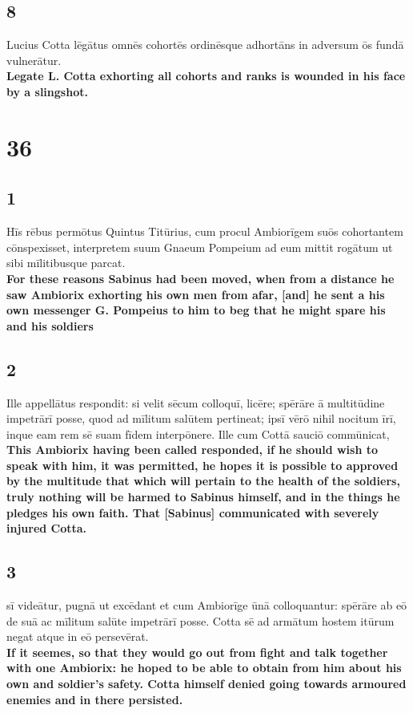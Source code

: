 \documentclass{article}
\begin{document}
\subsection*{8}
Lucius Cotta lēgātus omnēs cohortēs ordinēsque adhortāns in adversum ōs fundā vulnerātur.\\
\textbf{Legate L. Cotta exhorting all cohorts and ranks is wounded in his face by a slingshot.}

\section*{36}
\subsection*{1}
Hīs rēbus permōtus Quintus Titūrius, cum procul Ambiorīgem suōs cohortantem cōnspexisset, interpretem suum Gnaeum Pompeium ad eum mittit rogātum ut sibi mīlitibusque parcat.  \\ 
\textbf{For these reasons Sabinus had been moved, when from a distance he saw Ambiorix exhorting his own men from afar, [and] he sent a his own messenger G. Pompeius to him to beg that he might spare his and his soldiers}

\subsection*{2}
Ille appellātus respondit: si velit sēcum colloquī, licēre; spērāre ā multitūdine impetrārī posse, quod ad mīlitum salūtem pertineat; ipsī vērō nihil nocitum īrī, inque eam rem sē suam fīdem interpōnere. Ille cum Cottā sauciō commūnicat,  \\ 
\textbf{This Ambiorix having been called responded, if he should wish to speak with him, it was permitted, he hopes it is possible to approved by the multitude that which will pertain to the health of the soldiers, truly nothing will be harmed to Sabinus himself, and in the things he pledges his own faith. That [Sabinus] communicated with severely injured Cotta.}

\subsection*{3}
sī videātur, pugnā ut excēdant et cum Ambiorīge ūnā colloquantur: spērāre ab eō de suā ac mīlitum salūte impetrārī posse. Cotta sē ad armātum hostem itūrum negat atque in eō persevērat. \\ 
\textbf{If it seemes, so that they would go out from fight and talk together with one Ambiorix: he hoped to be able to obtain from him about his own and soldier's safety. Cotta himself denied going towards armoured enemies and in there persisted.}
\end{document}
